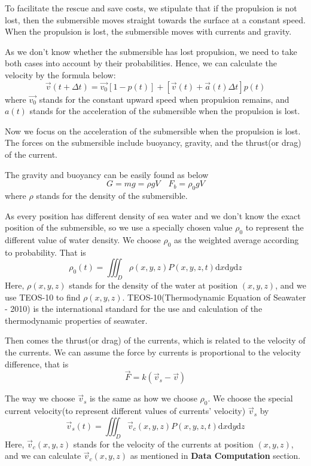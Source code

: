 \documentclass[12pt]{article}
\begin{document}
To facilitate the rescue and save costs, we stipulate that if the propulsion is not lost, then the submersible moves straight towards the surface at a constant speed. When the propulsion is lost, the submersible moves with currents and gravity. 

As we don't know whether the submersible has lost propulsion, we need to take both cases into account by their probabilities. Hence, we can calculate the velocity by the formula below:
$$\vec{v}(t+\Delta t)=\Vec{v_{0}}[1-p(t)]+[\vec{v}(t)+\Vec{a}(t)\Delta t]p(t)$$
where $\Vec{v_{0}}$ stands for the constant upward speed when propulsion remains, and $a(t)$ stands for the acceleration of the submersible when the propulsion is lost.

Now we focus on the acceleration of the submersible when the propulsion is lost. The forces on the submersible include buoyancy, gravity, and the thrust(or drag) of the current. 

The gravity and buoyancy can be easily found as below
$$G=mg=\rho gV \quad F_{b}=\rho_{0}gV$$
where $\rho$ stands for the density of the submersible.

As every position has different density of sea water and we don't know the exact position of the submersible, so we use a specially chosen value $\rho_{0}$ to represent the different value of water density. We choose $\rho_{0}$ as the weighted average according to probability. That is
$$\rho_{0}(t)=\iiint_{D}\rho(x,y,z)P(x,y,z,t)\mathrm{d}x\mathrm{d}y\mathrm{d}z$$
Here, $\rho(x,y,z)$ stands for the density of the water at position $(x,y,z)$, and we use TEOS-10 to find $\rho(x,y,z)$. TEOS-10(Thermodynamic Equation of Seawater - 2010) is the international standard for the use and calculation of the thermodynamic properties of seawater.\cite{TEOS-10}

Then comes the thrust(or drag) of the currents, which is related to the velocity of the currents. We can assume the force by currents is proportional to the velocity difference, that is
$$\Vec{F}=k(\Vec{v}_{s}-\vec{v})$$

The way we choose $\Vec{v}_{s}$ is the same as how we choose $\rho_{0}$. We choose the special current velocity(to represent different values of currents' velocity) $\Vec{v}_{s}$ by
$$\vec{v}_{s}(t)=\iiint_{D}\Vec{v}_{c}(x,y,z)P(x,y,z,t)\mathrm{d}x\mathrm{d}y\mathrm{d}z$$
Here, $\Vec{v}_{c}(x,y,z)$ stands for the velocity of the currents at position $(x,y,z)$, and we can calculate $\Vec{v}_{c}(x,y,z)$ as mentioned in \textbf{Data Computation} section.
\end{document}
